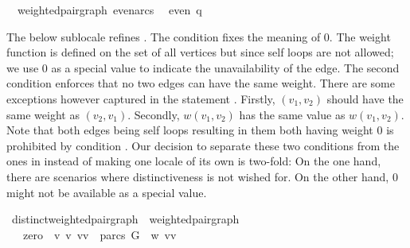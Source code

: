 \begin{isabellebody}
%
\isatagproof
%
\endisatagproof
{\isafoldproof}%
%
\isadelimproof
\isanewline
%
\endisadelimproof
\isanewline
{}\isamarkupfalse%
\ {\isacharparenleft}\ weighted{\isacharunderscore}pair{\isacharunderscore}graph{\isacharparenright}\ even{\isacharunderscore}arcs{\isacharcolon}\ \isanewline
{}\ {\isachardoublequoteopen}even\ q{\isachardoublequoteclose}%
\isadelimproof
%
\endisadelimproof
%
\isatagproof
%
\endisatagproof
{\isafoldproof}%
%
\isadelimproof
%
\endisadelimproof
%
\begin{isamarkuptext}%
The below sublocale  refines
. The condition 
 fixes the meaning of 0.
The weight function is defined on the set of all vertices but since self loops are not allowed; 
we use 0 as a special value to indicate the unavailability of the edge. 
The second condition  enforces that no two edges can have the same weight. There
are some exceptions however captured in the statement .
Firstly, $(v_1,v_2)$ should have the same weight as $(v_2,v_1)$. Secondly, $w(v_1,v_2)$ has the
same value as $w(v_1,v_2)$. Note that both edges being self loops resulting in them both having 
weight 0 is prohibited by condition .
Our decision to separate these two conditions from the ones in 
instead of making one locale of its own is two-fold: On the one hand, there are scenarios where 
distinctiveness is not wished for. On the other hand, 0 might not be available as a special value.%
\end{isamarkuptext}\isamarkuptrue%
\isamarkupfalse%
\ distinct{\isacharunderscore}weighted{\isacharunderscore}pair{\isacharunderscore}graph\ {\isacharequal}\ weighted{\isacharunderscore}pair{\isacharunderscore}graph\ {\isacharplus}\ \isanewline
\ \ \ zero{\isacharcolon}\ {\isachardoublequoteopen}{\isasymforall}\ v\ v\ {\isacharparenleft}vv\ {\isasymnotin}\ parcs\ G\ {\isasymlongleftrightarrow}\ w\ {\isacharparenleft}vv\ {\isacharequal}\ {}{\isachardoublequoteclose}\isanewline

\end{isabellebody}
